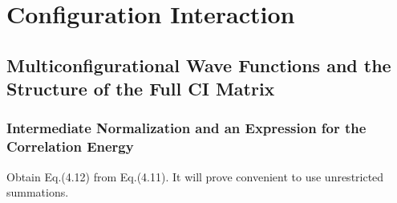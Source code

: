 \documentclass[a4paper]{book}
\newcounter{exercise}[chapter]
\begin{document}
	\tableofcontents

	\chapter{Configuration Interaction}
	
	\section{Multiconfigurational Wave Functions and the Structure of the Full CI Matrix}
	
	\subsection{Intermediate Normalization and an Expression for the Correlation Energy}
	
	\begin{exercise}
	Obtain Eq.(4.12) from Eq.(4.11). It will prove convenient to use unrestricted summations.
	\end{exercise}
	
\end{document}

